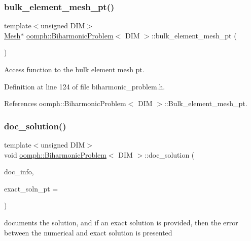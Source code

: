 \subsubsection{\texorpdfstring{bulk\+\_\+element\+\_\+mesh\+\_\+pt()}{bulk\_element\_mesh\_pt()}}
{\footnotesize\ttfamily template$<$unsigned D\+IM$>$ \\
\hyperlink{classoomph_1_1Mesh}{Mesh}$\ast$ \hyperlink{classoomph_1_1BiharmonicProblem}{oomph\+::\+Biharmonic\+Problem}$<$ D\+IM $>$\+::bulk\+\_\+element\+\_\+mesh\+\_\+pt (\begin{DoxyParamCaption}{ }\end{DoxyParamCaption})\hspace{0.3cm}{\ttfamily [inline]}}



Access function to the bulk element mesh pt. 



Definition at line 124 of file biharmonic\+\_\+problem.\+h.



References oomph\+::\+Biharmonic\+Problem$<$ D\+I\+M $>$\+::\+Bulk\+\_\+element\+\_\+mesh\+\_\+pt.

\mbox{\label{classoomph_1_1BiharmonicProblem_a4f978440c83f738544b15995d0c6a178}} 
\subsubsection{\texorpdfstring{doc\+\_\+solution()}{doc\_solution()}}
{\footnotesize\ttfamily template$<$unsigned D\+IM$>$ \\
void \hyperlink{classoomph_1_1BiharmonicProblem}{oomph\+::\+Biharmonic\+Problem}$<$ D\+IM $>$\+::doc\+\_\+solution (\begin{DoxyParamCaption}\item[{\hyperlink{classoomph_1_1DocInfo}{Doc\+Info} \&}]{doc\+\_\+info,  }\item[{\hyperlink{classoomph_1_1FiniteElement_a690fd33af26cc3e84f39bba6d5a85202}{Finite\+Element\+::\+Steady\+Exact\+Solution\+Fct\+Pt}}]{exact\+\_\+soln\+\_\+pt = {} }\end{DoxyParamCaption})}



documents the solution, and if an exact solution is provided, then the error between the numerical and exact solution is presented 



